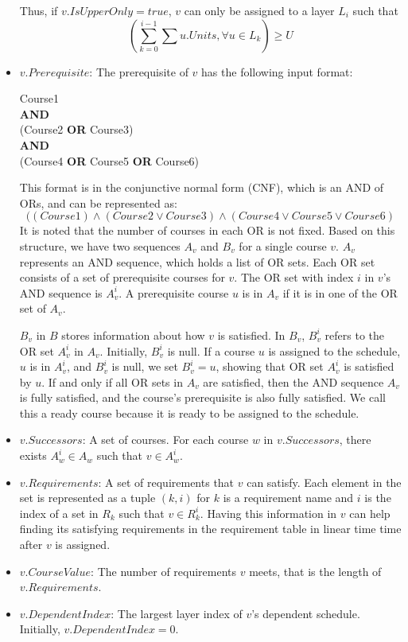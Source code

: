 \documentclass[letterpaper,12pt]{article}
\theoremstyle{definition}
\begin{document}
\begin{itemize}
    Thus, if $v.IsUpperOnly=true$, $v$ can only be assigned to a layer $L_i$ such that \[(\sum_{k=0}^{i-1} \sum u.Units, \forall u\in L_k) \geq U\]
    
    \item $v.Prerequisite$: The prerequisite of $v$ has the following input format:
    \begin{displayquote}
    Course1\\
    \textbf{AND}\\
    (Course2 \textbf{OR} Course3)\\
    \textbf{AND}\\
    (Course4 \textbf{OR} Course5 \textbf{OR} Course6)
    \end{displayquote}
    This format is in the conjunctive normal form (CNF), which is an AND of ORs, and can be represented as:
    $$((Course1) \wedge (Course2 \vee Course3) \wedge (Course4 \vee Course5 \vee Course6) $$
    It is noted that the number of courses in each OR is not fixed.
    Based on this structure, we have two sequences $A_v$ and $B_v$ for a single course $v$. $A_v$ represents an AND sequence, which holds a list of OR sets. Each OR set consists of a set of prerequisite courses for $v$. The OR set with index $i$ in $v$'s AND sequence is $A_v^i$. A prerequisite course $u$ is in $A_v$ if it is in one of the OR set of $A_v$.
    
    $B_v$ in $B$ stores information about how $v$ is satisfied. In $B_v$, $B_v^i$ refers to the OR set $A_v^i$ in $A_v$. Initially, $B_v^i$ is null. If a course $u$ is assigned to the schedule, $u$ is in $A_v^i$, and $B_v^i$ is null, we set $B_v^i=u$, showing that OR set $A_v^i$ is satisfied by $u$. If and only if all OR sets in $A_v$ are satisfied, then the AND sequence $A_v$ is fully satisfied, and the course's prerequisite is also fully satisfied. We call this a ready course because it is ready to be assigned to the schedule. 
    \item $v.Successors$: A set of courses. For each course $w$ in $v.Successors$, there exists $A_w^i \in A_w$ such that $v \in A_w^i$.  
    \item $v.Requirements$: A set of requirements that $v$ can satisfy.
    Each element in the set is represented as a tuple $(k,i)$ for $k$ is a requirement name and $i$ is the index of a set in $R_k$ such that $v\in R_k^i$. 
    Having this information in $v$ can help finding its satisfying requirements in the requirement table in linear time time after $v$ is assigned. 
    \item $v.CourseValue$: The number of requirements $v$ meets, that is the length of $v.Requirements$. 
    \item $v.DependentIndex$: The largest layer index of $v$'s dependent schedule. Initially, $v.DependentIndex=0$.
\end{itemize}
\end{document}
